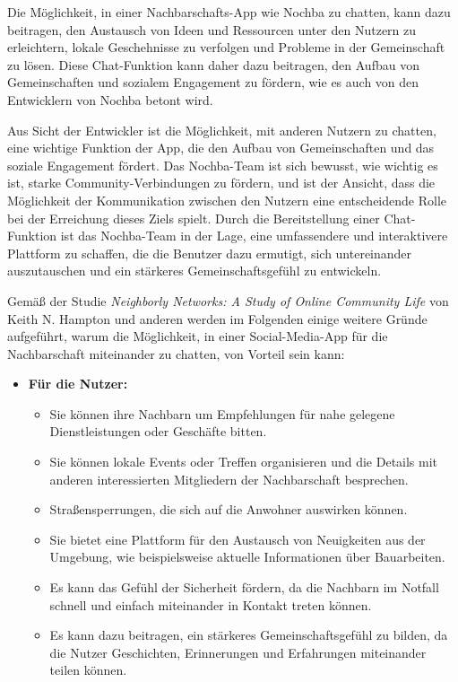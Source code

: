 Die Möglichkeit, in einer Nachbarschafts-App wie Nochba zu chatten, kann dazu beitragen, den Austausch von Ideen und Ressourcen unter den Nutzern zu erleichtern, lokale Geschehnisse zu verfolgen und Probleme in der Gemeinschaft zu lösen. Diese Chat-Funktion kann daher dazu beitragen, den Aufbau von Gemeinschaften und sozialem Engagement zu fördern, wie es auch von den Entwicklern von Nochba betont wird.

Aus Sicht der Entwickler ist die Möglichkeit, mit anderen Nutzern zu chatten, eine wichtige Funktion der App, die den Aufbau von Gemeinschaften und das soziale Engagement fördert. Das Nochba-Team ist sich bewusst, wie wichtig es ist, starke Community-Verbindungen zu fördern, und ist der Ansicht, dass die Möglichkeit der Kommunikation zwischen den Nutzern eine entscheidende Rolle bei der Erreichung dieses Ziels spielt. Durch die Bereitstellung einer Chat-Funktion ist das Nochba-Team in der Lage, eine umfassendere und interaktivere Plattform zu schaffen, die die Benutzer dazu ermutigt, sich untereinander auszutauschen und ein stärkeres Gemeinschaftsgefühl zu entwickeln.

Gemäß der Studie \textit{Neighborly Networks: A Study of Online Community Life} von Keith N. Hampton und anderen werden im Folgenden einige weitere Gründe aufgeführt, warum die Möglichkeit, in einer Social-Media-App für die Nachbarschaft miteinander zu chatten, von Vorteil sein kann:

\begin{itemize}
  \item \textbf{Für die Nutzer:}
        \begin{itemize}
          \item {Sie können ihre Nachbarn um Empfehlungen für nahe gelegene Dienstleistungen oder Geschäfte bitten.}
          \item {Sie können lokale Events oder Treffen organisieren und die Details mit anderen interessierten Mitgliedern der Nachbarschaft besprechen.}
          \item {Straßensperrungen, die sich auf die Anwohner auswirken können.}
          \item {Sie bietet eine Plattform für den Austausch von Neuigkeiten aus der Umgebung, wie beispielsweise aktuelle Informationen über Bauarbeiten.}
          \item {Es kann das Gefühl der Sicherheit fördern, da die Nachbarn im Notfall schnell und einfach miteinander in Kontakt treten können.}
          \item {Es kann dazu beitragen, ein stärkeres Gemeinschaftsgefühl zu bilden, da die Nutzer Geschichten, Erinnerungen und Erfahrungen miteinander teilen können.}
        \end{itemize}
\end{itemize}

